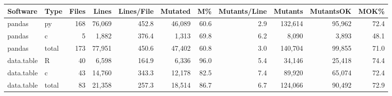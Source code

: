 \begin{tabular}{llrrrrrrrrr}
  \hline
Software & Type & Files & Lines & Lines/File & Mutated & M\% & Mutants/Line & Mutants & MutantsOK & MOK\% \\ 
  \hline
pandas & py & 168 & 76,069 & 452.8 & 46,089 & 60.6 & 2.9 & 132,614 & 95,962 & 72.4 \\ 
  pandas & c &  5 & 1,882 & 376.4 & 1,313 & 69.8 & 6.2 & 8,090 & 3,893 & 48.1 \\ 
  pandas & total & 173 & 77,951 & 450.6 & 47,402 & 60.8 & 3.0 & 140,704 & 99,855 & 71.0 \\ 
  data.table & R & 40 & 6,598 & 164.9 & 6,336 & 96.0 & 5.4 & 34,146 & 25,418 & 74.4 \\ 
  data.table & c & 43 & 14,760 & 343.3 & 12,178 & 82.5 & 7.4 & 89,920 & 65,074 & 72.4 \\ 
  data.table & total & 83 & 21,358 & 257.3 & 18,514 & 86.7 & 6.7 & 124,066 & 90,492 & 72.9 \\ 
   \hline
\end{tabular}
